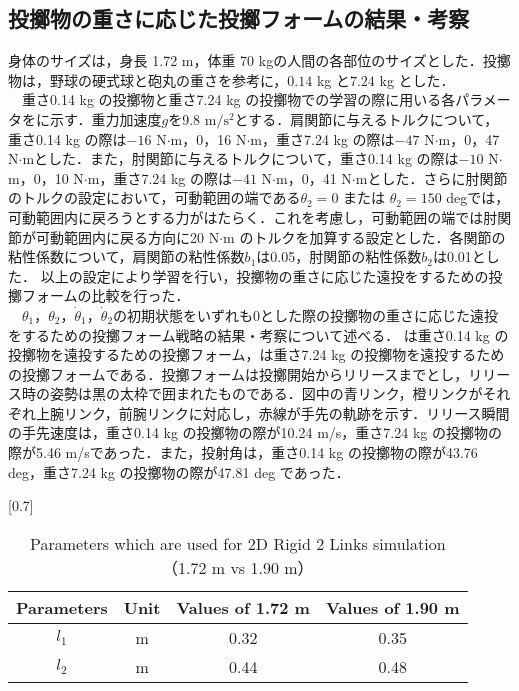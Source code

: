 \begin{small}
\subsection{投擲物の重さに応じた投擲フォームの結果・考察}
身体のサイズは，身長 1.72 m，体重 70 kgの人間の各部位のサイズとした．投擲物は，野球の硬式球と砲丸の重さを参考に，$0.14$ kg\cite{horiuchi} と$7.24$ kg\cite{haq} とした．\\
　重さ0.14 kg の投擲物と重さ7.24 kg の投擲物での学習の際に用いる各パラメータをに示す\cite{irving}．重力加速度$g$を9.8 $\mathrm{m/s^{2}}$とする．肩関節に与えるトルクについて，重さ0.14 kg の際は$-16$ N$\cdot$m，0，16 N$\cdot$m，重さ7.24 kg の際は$-47$ N$\cdot$m，0，47 N$\cdot$mとした．また，肘関節に与えるトルクについて，重さ0.14 kg の際は$-10$ N$\cdot$m，0，10 N$\cdot$m，重さ7.24 kg の際は$-41$ N$\cdot$m，0，41 N$\cdot$mとした．さらに肘関節のトルクの設定において，可動範囲の端である$\theta_{2} = 0$ または $\theta_{2} = 150$ degでは，可動範囲内に戻ろうとする力がはたらく．これを考慮し，可動範囲の端では肘関節が可動範囲内に戻る方向に20 N$\cdot$m のトルクを加算する設定とした．各関節の粘性係数について，肩関節の粘性係数$b_{1}$は0.05，肘関節の粘性係数$b_{2}$は0.01とした．
以上の設定により学習を行い，投擲物の重さに応じた遠投をするための投擲フォームの比較を行った．\\
　$\theta_{1}$，$\theta_{2}$，$\dot{\theta}_{1}$，$\dot{\theta}_{2}$の初期状態をいずれも0とした際の投擲物の重さに応じた遠投をするための投擲フォーム戦略の結果・考察について述べる．
は重さ0.14 kg の投擲物を遠投するための投擲フォーム，は重さ7.24 kg の投擲物を遠投するための投擲フォームである．投擲フォームは投擲開始からリリースまでとし，リリース時の姿勢は黒の太枠で囲まれたものである．図中の青リンク，橙リンクがそれぞれ上腕リンク，前腕リンクに対応し，赤線が手先の軌跡を示す．リリース瞬間の手先速度は，重さ0.14 kg の投擲物の際が10.24 m/s，重さ7.24 kg の投擲物の際が5.46 m/sであった．また，投射角は，重さ0.14 kg の投擲物の際が43.76 deg，重さ7.24 kg の投擲物の際が47.81 deg であった．
\begin{table}[tb]
  \begin{center}
    \caption{Parameters which are used for 2D Rigid 2 Links simulation（1.72 m vs 1.90 m）}
    \scalebox{0.7}[0.7]{
    \begin{tabular}{c|c|c|c}
      \hline
      Parameters & Unit & Values of 1.72 m & Values of 1.90 m \\
      \hline
      $l_{1}$ & m & 0.32 & 0.35 \\
      $l_{2}$ & m & 0.44 & 0.48 \\

\end{tabular}}
\end{center}
\end{table}
\end{small}
